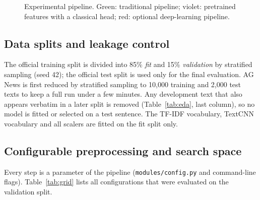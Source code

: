 \begin{figure}[H]
\caption{Experimental pipeline. Green: traditional pipeline; violet: pretrained features with a classical head; red: optional deep-learning pipeline.}
\label{fig:pipeline}
\end{figure}

\subsection{Data splits and leakage control}
The official training split is divided into 85\% \emph{fit} and 15\% \emph{validation} by stratified sampling (seed 42); the official test split is used only for the final evaluation. AG News is first reduced by stratified sampling to 10{,}000 training and 2{,}000 test texts to keep a full run under a few minutes. Any development text that also appears verbatim in a later split is removed (Table~\ref{tab:eda}, last column), so no model is fitted or selected on a test sentence. The TF-IDF vocabulary, TextCNN vocabulary and all scalers are fitted on the fit split only.

\subsection{Configurable preprocessing and search space}
Every step is a parameter of the pipeline (\texttt{modules/config.py} and command-line flags). Table~\ref{tab:grid} lists all configurations that were evaluated on the validation split.

